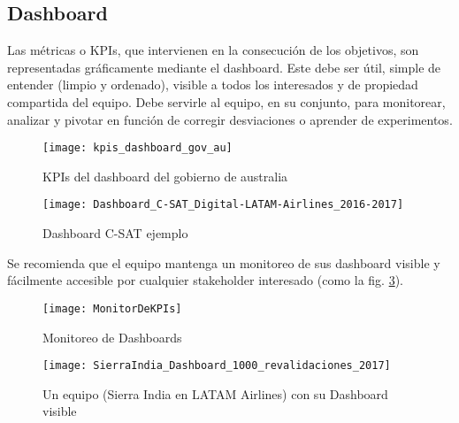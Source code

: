 \subsection{Dashboard}

Las métricas o KPIs, que intervienen en la consecución de los objetivos, son representadas gráficamente mediante el dashboard. Este debe ser útil, simple de entender (limpio y ordenado), visible a todos los interesados y de propiedad compartida del equipo. Debe servirle al equipo, en su conjunto, para monitorear, analizar y pivotar en función de corregir desviaciones o aprender de experimentos.

  \begin{figure}[h]
  \centering
  \texttt{[image: kpis\_dashboard\_gov\_au]}
  \caption{KPIs del dashboard del gobierno de australia}
  \centering
  \label{fig:kpis_dashboard_gov_au} %
  \end{figure}
  \FloatBarrier

  \begin{figure}[h]
  \centering
  \texttt{[image: Dashboard\_C-SAT\_Digital-LATAM-Airlines\_2016-2017]}
  \caption{Dashboard C-SAT ejemplo}
  \centering
  \label{fig:Dashboard_C-SAT_Digital-LATAM-Airlines_2016-2017} %
  \end{figure}
  \FloatBarrier
  
  Se recomienda que el equipo mantenga un monitoreo de sus dashboard visible y fácilmente accesible por cualquier stakeholder interesado (como la fig. \ref{fig:MonitorDeKPIs}).
  
  \begin{figure}[h]
  \centering
  \texttt{[image: MonitorDeKPIs]}
  \caption{Monitoreo de Dashboards}
  \centering
  \label{fig:MonitorDeKPIs} %
\end{figure}
\FloatBarrier %

  \begin{figure}[h]
  \centering
  \texttt{[image: SierraIndia\_Dashboard\_1000\_revalidaciones\_2017]}
  \caption{Un equipo (Sierra India en LATAM Airlines) con su Dashboard visible}
  \centering
  \label{fig:SierraIndia_Dashboard_1000_revalidaciones_2017} %
  \end{figure}
  \FloatBarrier
  
